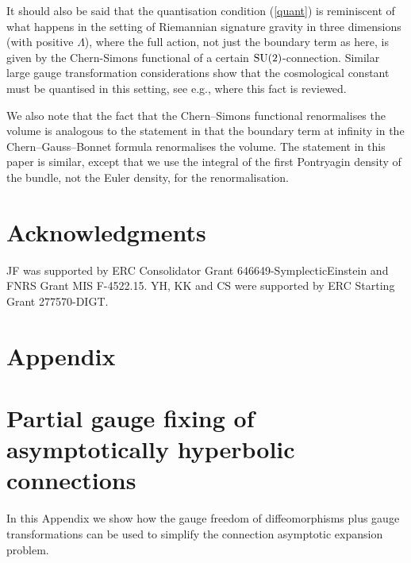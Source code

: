 \documentclass[a4paper,12pt]{article}
\begin{document}
It should also be said that the quantisation condition (\ref{quant}) is reminiscent of what happens in the setting of Riemannian signature gravity in three dimensions (with positive $\Lambda$), where the full action, not just the boundary term as here, is given by the Chern-Simons functional of a certain ${\rm SU}(2)$-connection. Similar large gauge transformation considerations show that the cosmological constant must be quantised in this setting, see e.g., \cite{Freidel:1998ua} where this fact is reviewed. 

We also note that the fact that the Chern--Simons functional renormalises the volume is analogous to the statement in \cite{Anderson} that the boundary term at infinity in the Chern--Gauss--Bonnet formula renormalises the volume. The statement in this paper is similar, except that we use the integral of the first Pontryagin density of the bundle, not the Euler density, for the renormalisation. 

\section*{Acknowledgments}

JF was supported by ERC Consolidator Grant 646649-SymplecticEinstein and FNRS Grant MIS F-4522.15. YH, KK and CS were supported by ERC Starting Grant 277570-DIGT\@. 

\section*{Appendix}
\appendix
\section{Partial gauge fixing of asymptotically hyperbolic connections}

In this Appendix we show how the gauge freedom of diffeomorphisms plus gauge transformations can be used to simplify the connection asymptotic expansion problem. 
\end{document}
